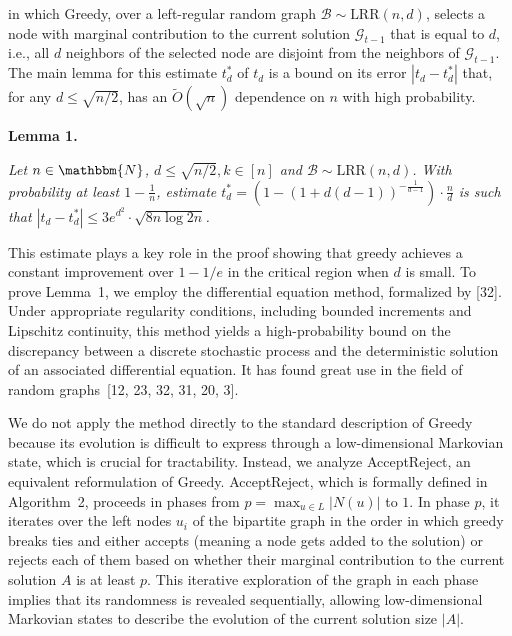 \documentclass[10pt,a4paper]{article}
\begin{document}
in which Greedy, over a left-regular random graph $\mathcal{B}\sim\text{{LRR}}(n,d)$, selects a node with marginal contribution to the current solution $\mathcal{G}_{t-1}$ that is equal to $d$, i.e., all $d$ neighbors of the selected node are disjoint from the neighbors of $\mathcal{G}_{t-1}$. The main lemma for this estimate $t^{*}_{d}$ of $t_{d}$ is a bound on its error $|t_{d}-t^{*}_{d}|$ that, for any $d\leq\sqrt{n/2}$, has an $\tilde{O}(\sqrt{n})$ dependence on $n$ with high probability.\par





\par\medskip\noindent\textbf{\textbf{Lemma 1}\textbf{.}}\par



\emph{Let $n\in\mathbbm{N}$, $d\leq\sqrt{n/2},k\in[n]$ and $\mathcal{B}\sim\text{{LRR}}(n,d)$.
With probability at least $1-\frac{1}{n}$, estimate $t^{*}_{d}=\left(1-\left(1+d(d-1)\right)^{-\frac{1}{d-1}}\right)\cdot\frac{n}{d}$ is such that
$|t_{d}-t^{*}_{d}|\leq 3e^{d^{2}}\cdot\sqrt{8n\log{2n}}$.}\par






This estimate plays a key role in the proof showing that greedy achieves a constant improvement over $1-1/e$ in the critical region when $d$ is small. To prove Lemma 1, we employ the differential equation method, formalized by [32].
Under appropriate regularity conditions, including bounded increments and Lipschitz continuity, this method yields a high-probability bound on the discrepancy between a discrete stochastic process and the deterministic solution of an associated differential equation. It has found great use in the field of random graphs [12, 23, 32, 31, 20, 3].\par




We do not apply the method directly to the standard description of Greedy because its evolution is difficult to express through a low-dimensional Markovian state, which is crucial for tractability. Instead, we analyze
AcceptReject, an equivalent reformulation of Greedy.
AcceptReject, which is formally defined in Algorithm 2, proceeds in phases from $p=\max_{u\in L}|N(u)|$ to $1$. In phase $p$, it iterates over the left nodes $u_{i}$ of the bipartite graph in the order in which greedy breaks ties and either accepts (meaning a node gets added to the solution) or rejects each of them based on whether their marginal contribution to the current solution $A$ is at least $p$. This iterative exploration of the graph in each phase implies that its randomness is revealed sequentially, allowing low-dimensional Markovian states to describe the evolution of the current solution size $|A|$.\par
\end{document}

